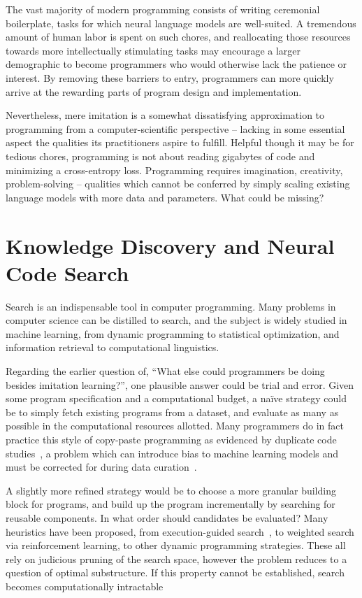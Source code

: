 \documentclass[10pt]{article}
\begin{document}
The vast majority of modern programming consists of writing ceremonial boilerplate, tasks for which neural language models are well-suited. A tremendous amount of human labor is spent on such chores, and reallocating those resources towards more intellectually stimulating tasks may encourage a larger demographic to become programmers who would otherwise lack the patience or interest. By removing these barriers to entry, programmers can more quickly arrive at the rewarding parts of program design and implementation.

Nevertheless, mere imitation is a somewhat dissatisfying approximation to programming from a computer-scientific perspective -- lacking in some essential aspect the qualities its practitioners aspire to fulfill. Helpful though it may be for tedious chores, programming is not about reading gigabytes of code and minimizing a cross-entropy loss. Programming requires imagination, creativity, problem-solving -- qualities which cannot be conferred by simply scaling existing language models with more data and parameters. What could be missing?

  \section{Knowledge Discovery and Neural Code Search}

Search is an indispensable tool in computer programming. Many problems in computer science can be distilled to search, and the subject is widely studied in machine learning, from dynamic programming to statistical optimization, and information retrieval to computational linguistics.

Regarding the earlier question of, ``What else could programmers be doing besides imitation learning?'', one plausible answer could be trial and error. Given some program specification and a computational budget, a na\"ive strategy could be to simply fetch existing programs from a dataset, and evaluate as many as possible in the computational resources allotted. Many programmers do in fact practice this style of copy-paste programming as evidenced by duplicate code studies~\cite{lopes2017dejavu}, a problem which can introduce bias to machine learning models and must be corrected for during data curation~\cite{allamanis2019adverse}.


A slightly more refined strategy would be to choose a more granular building block for programs, and build up the program incrementally by searching for reusable components. In what order should candidates be evaluated? Many heuristics have been proposed, from execution-guided search~\cite{chen2018execution, wang2018execution}, to weighted search via reinforcement learning, to other dynamic programming strategies. These all rely on judicious pruning of the search space, however the problem reduces to a question of optimal substructure. If this property cannot be established, search becomes computationally intractable
\end{document}
